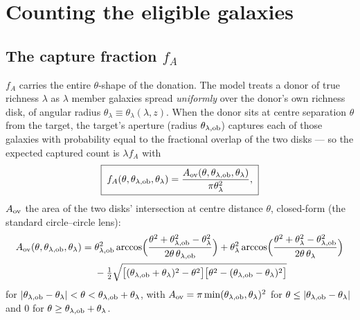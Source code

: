 \documentclass[a4paper, 11pt]{article}
\newcommand{\thob}{\theta_{\lambda,{\rm ob}}}
\begin{document}
\section{Counting the eligible galaxies}
\label{sec:kernels}

\subsection{The capture fraction \texorpdfstring{$f_A$}{fA}}
\label{sec:fA}

$f_A$ carries the entire $\theta$-shape of the donation. The
model treats a donor of true richness $\lambda$ as $\lambda$
member galaxies spread \emph{uniformly} over the donor's own
richness disk, of angular radius
$\theta_\lambda \equiv \theta_\lambda(\lambda,z)$. When the donor
sits at centre separation $\theta$ from the target, the target's
aperture (radius $\thob$) captures each of those galaxies with
probability equal to the fractional overlap of the two disks ---
so the expected captured count is $\lambda f_A$ with
\begin{equation}
\boxed{\;
f_A(\theta,\thob,\theta_\lambda)
= \frac{A_{\rm ov}(\theta,\thob,\theta_\lambda)}
       {\pi\theta_\lambda^2},
\;}
\label{eq:fA_def}
\end{equation}
$A_{\rm ov}$ the area of the two disks' intersection at centre
distance $\theta$, closed-form (the standard circle--circle lens):
\begin{align}
A_{\rm ov}(\theta,\thob,\theta_\lambda)
=\;& \thob^2
\arccos\!\Big(\frac{\theta^2+\thob^2
                     -\theta_\lambda^2}{2\theta\,\thob}\Big)
+ \theta_\lambda^2
\arccos\!\Big(\frac{\theta^2+\theta_\lambda^2
                     -\thob^2}{2\theta\,\theta_\lambda}\Big)
\notag\\
&- \tfrac12\sqrt{\big[(\thob+\theta_\lambda)^2-\theta^2\big]
                 \big[\theta^2-(\thob-\theta_\lambda)^2\big]}
\label{eq:lens}
\end{align}
for $|\thob-\theta_\lambda|<\theta<\thob+\theta_\lambda$, with
$A_{\rm ov}=\pi\min(\thob,\theta_\lambda)^2$ for
$\theta\le|\thob-\theta_\lambda|$ and $0$ for
$\theta\ge\thob+\theta_\lambda$.
\end{document}
